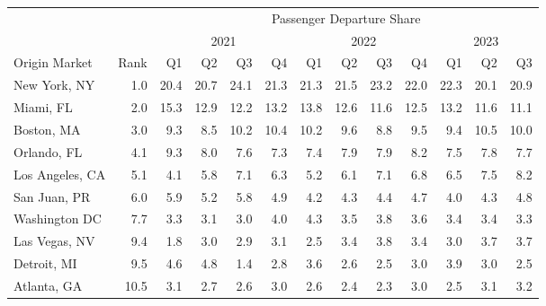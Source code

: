 
\begin{tabular}[t]{lrrrrrrrrrrrr}
\toprule
\multicolumn{1}{c}{ } & \multicolumn{1}{c}{ } & \multicolumn{11}{c}{Passenger Departure Share} \\
\cmidrule(l{3pt}r{3pt}){3-13}
\multicolumn{1}{c}{ } & \multicolumn{1}{c}{ } & \multicolumn{4}{c}{2021} & \multicolumn{4}{c}{2022} & \multicolumn{3}{c}{2023} \\
\cmidrule(l{3pt}r{3pt}){3-6} \cmidrule(l{3pt}r{3pt}){7-10} \cmidrule(l{3pt}r{3pt}){11-13}
Origin Market & Rank & Q1 & Q2 & Q3 & Q4 & Q1 & Q2 & Q3 & Q4 & Q1 & Q2 & Q3\\
\midrule
New York, NY & 1.0 & 20.4 & 20.7 & 24.1 & 21.3 & 21.3 & 21.5 & 23.2 & 22.0 & 22.3 & 20.1 & 20.9\\
Miami, FL & 2.0 & 15.3 & 12.9 & 12.2 & 13.2 & 13.8 & 12.6 & 11.6 & 12.5 & 13.2 & 11.6 & 11.1\\
Boston, MA & 3.0 & 9.3 & 8.5 & 10.2 & 10.4 & 10.2 & 9.6 & 8.8 & 9.5 & 9.4 & 10.5 & 10.0\\
Orlando, FL & 4.1 & 9.3 & 8.0 & 7.6 & 7.3 & 7.4 & 7.9 & 7.9 & 8.2 & 7.5 & 7.8 & 7.7\\
Los Angeles, CA & 5.1 & 4.1 & 5.8 & 7.1 & 6.3 & 5.2 & 6.1 & 7.1 & 6.8 & 6.5 & 7.5 & 8.2\\
\addlinespace
San Juan, PR & 6.0 & 5.9 & 5.2 & 5.8 & 4.9 & 4.2 & 4.3 & 4.4 & 4.7 & 4.0 & 4.3 & 4.8\\
Washington DC & 7.7 & 3.3 & 3.1 & 3.0 & 4.0 & 4.3 & 3.5 & 3.8 & 3.6 & 3.4 & 3.4 & 3.3\\
Las Vegas, NV & 9.4 & 1.8 & 3.0 & 2.9 & 3.1 & 2.5 & 3.4 & 3.8 & 3.4 & 3.0 & 3.7 & 3.7\\
Detroit, MI & 9.5 & 4.6 & 4.8 & 1.4 & 2.8 & 3.6 & 2.6 & 2.5 & 3.0 & 3.9 & 3.0 & 2.5\\
Atlanta, GA & 10.5 & 3.1 & 2.7 & 2.6 & 3.0 & 2.6 & 2.4 & 2.3 & 3.0 & 2.5 & 3.1 & 3.2\\
\bottomrule
\end{tabular}
